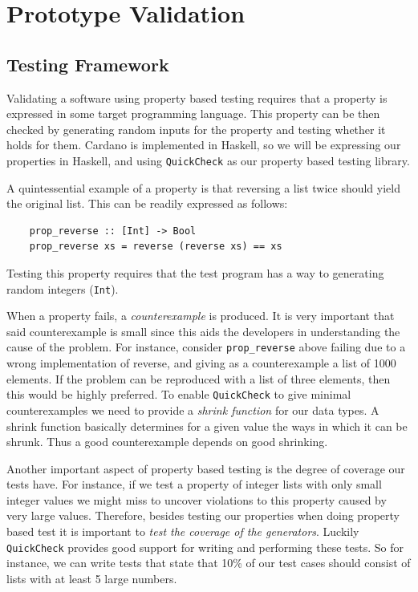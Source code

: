 \section{Prototype Validation}\label{prototype_validation}

\subsection{Testing Framework}\label{testing_framework}
Validating a software using property based testing requires that a property is
expressed in some target programming language. This property can be then
checked by generating random inputs for the property and testing whether it
holds for them. Cardano is implemented in Haskell, so we will be expressing our
properties in Haskell, and using \lstinline{QuickCheck} as our property based
testing library.

A quintessential example of a property is that reversing a list twice should
yield the original list. This can be readily expressed as follows:

\begin{lstlisting}
	prop_reverse :: [Int] -> Bool
	prop_reverse xs = reverse (reverse xs) == xs
\end{lstlisting}

Testing this property requires that the test program has a way to generating
random integers (\lstinline{Int}).

When a property fails, a \emph{counterexample} is produced. It is very
important that said counterexample is small since this aids the developers in
understanding the cause of the problem. For instance, consider
\lstinline{prop_reverse} above failing due to a wrong implementation of
reverse, and giving as a counterexample a list of 1000 elements. If the problem
can be reproduced with a list of three elements, then this would be highly
preferred. To enable \lstinline{QuickCheck} to give minimal counterexamples
we need to provide a \emph{shrink function} for our data types. A shrink
function basically determines for a given value the ways in which it can be
shrunk. Thus a good counterexample depends on good shrinking.

Another important aspect of property based testing is the degree of coverage
our tests have. For instance, if we test a property of integer lists with only
small integer values we might miss to uncover violations to this property
caused by very large values. Therefore, besides testing our properties when
doing property based test it is important to \emph{test the coverage of the
	generators}. Luckily \lstinline{QuickCheck} provides good support for
writing
and performing these tests. So for instance, we can write tests that state that
10\% of our test cases should consist of lists with at least 5 large numbers.

